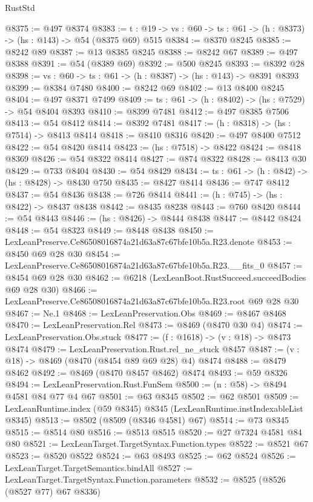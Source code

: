 \begin{lexlean}{RustStd}
\begin{coremodule}
@8375 := @497 @8374
@8383 := {t : @19} -> {vs : @60} -> {ts : @61} -> (h : @8373) -> (hs : @143) -> @54 (@8375 @69) @515
@8384 := @8370 @8245
@8385 := @8242 @89
@8387 := @13 @8385 @8245
@8388 := @8242 @67
@8389 := @497 @8388
@8391 := @54 (@8389 @69)
@8392 := @500 @8245
@8393 := @8392 @28
@8398 := {vs : @60} -> {ts : @61} -> (h : @8387) -> (hs : @143) -> @8391 @8393
@8399 := @8384 @7480
@8400 := @8242 @69
@8402 := @13 @8400 @8245
@8404 := @497 @8371 @7499
@8409 := {ts : @61} -> (h : @8402) -> (hs : @7529) -> @54 @8404 @8393
@8410 := @8399 @7481
@8412 := @497 @8385 @7506
@8413 := @54 @8412
@8414 := @8392 @7481
@8417 := (h : @8318) -> (hs : @7514) -> @8413 @8414
@8418 := @8410 @8316
@8420 := @497 @8400 @7512
@8422 := @54 @8420 @8414
@8423 := (hs : @7518) -> @8422
@8424 := @8418 @8369
@8426 := @54 @8322 @8414
@8427 := @874 @8322
@8428 := @8413 @30
@8429 := @733 @8404
@8430 := @54 @8429
@8434 := {ts : @61} -> (h : @842) -> (hs : @8428) -> @8430 @750
@8435 := @8427 @8414
@8436 := @747 @8412
@8437 := @54 @8436
@8438 := @726 @8414
@8441 := (h : @745) -> (hs : @8422) -> @8437 @8438
@8442 := @8435 @8238
@8443 := @760 @8420
@8444 := @54 @8443
@8446 := (hs : @8426) -> @8444 @8438
@8447 := @8442 @8424
@8448 := @54 @8323
@8449 := @8448 @8438
@8450 := LexLeanPreserve.Ce86508016874a21d63a87c67bfe10b5a.R23.denote
@8453 := @8450 @69 @28 @30
@8454 := LexLeanPreserve.Ce86508016874a21d63a87c67bfe10b5a.R23.__fits_0
@8457 := @8454 @69 @28 @30
@8462 := @6218 (LexLeanBoot.RustSucceed.succeedBodies @69 @28 @30)
@8466 := LexLeanPreserve.Ce86508016874a21d63a87c67bfe10b5a.R23.root @69 @28 @30
@8467 := Ne.{1}
@8468 := LexLeanPreservation.Obs
@8469 := @8467 @8468
@8470 := LexLeanPreservation.Rel
@8473 := @8469 (@8470 @30 @4)
@8474 := LexLeanPreservation.Obs.stuck
@8477 := (f : @1618) -> (v : @18) -> @8473 @8474
@8479 := LexLeanPreservation.Rust.rel_ne_stuck @8457
@8487 := (v : @18) -> @8469 (@8470 (@8454 @89 @69 @28) @4) @8474
@8488 := @8479 @8462
@8492 := @8469 (@8470 @8457 @8462) @8474
@8493 := @59 @8326
@8494 := LexLeanPreservation.Rust.FunSem
@8500 := (n : @58) -> @8494 @4581 @84 @77 @4 @67
@8501 := @63 @8345
@8502 := @62 @8501
@8509 := LexLeanRuntime.index (@59 @8345) @8345 (LexLeanRuntime.instIndexableList @8345)
@8513 := @8502 (@8509 (@8346 @4581) @67)
@8514 := @73 @8345
@8515 := @8514 @80
@8516 := @8513 @8515
@8520 := @27 @7324 @4581 @84 @80
@8521 := LexLeanTarget.TargetSyntax.Function.types
@8522 := @8521 @67
@8523 := @8520 @8522
@8524 := @63 @8493
@8525 := @62 @8524
@8526 := LexLeanTarget.TargetSemantics.bindAll
@8527 := LexLeanTarget.TargetSyntax.Function.parameters
@8532 := @8525 (@8526 (@8527 @77) @67 @8336)

\end{coremodule}
\end{lexlean}
